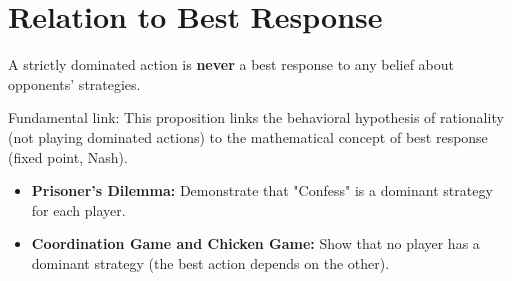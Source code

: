 \section{Relation to Best Response}

\begin{proposition}
A strictly dominated action is \textbf{never} a best response to any belief about opponents' strategies.
\end{proposition}
\begin{remarque}
Fundamental link: This proposition links the behavioral hypothesis of rationality (not playing dominated actions) to the mathematical concept of best response (fixed point, Nash).
\end{remarque}
\begin{exercice}
\begin{itemize}
    \item \textbf{Prisoner's Dilemma:} Demonstrate that "Confess" is a dominant strategy for each player.
    \item \textbf{Coordination Game and Chicken Game:} Show that no player has a dominant strategy (the best action depends on the other).
\end{itemize}
\end{exercice}

